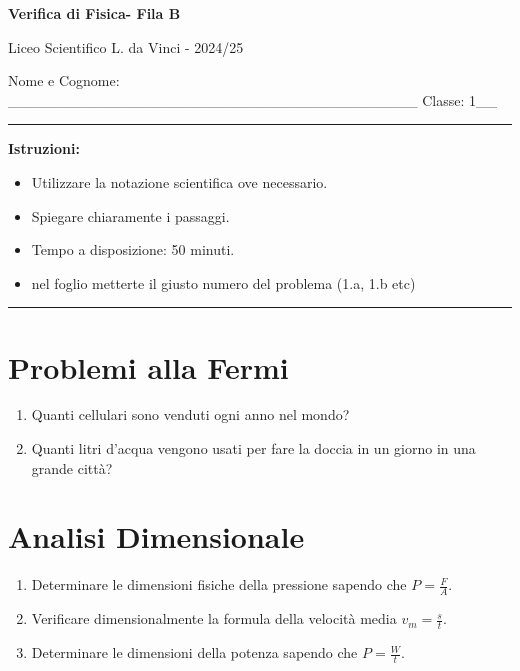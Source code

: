 \documentclass[12pt]{article}
\begin{document}
\begin{center}
    \textbf{\Large Verifica di Fisica- Fila B}
    \vspace{0.25cm}
    
    Liceo Scientifico L. da Vinci - 2024/25
    \vspace{0.25cm}
    
\end{center}
Nome e Cognome: \_\_\_\_\_\_\_\_\_\_\_\_\_\_\_\_\_\_\_\_\_\_\_\_\_\_\_\_\_\_\_\_\_\_\_\_\_\_\_ 
 \hspace{4cm} Classe: 1\_\_
\vspace{0.5cm}
\hrule
\vspace{0.5cm}

\textbf{Istruzioni:} 
\begin{itemize}
    \item Utilizzare la notazione scientifica ove necessario.
    \item Spiegare chiaramente i passaggi.
    \item Tempo a disposizione: 50 minuti.
    \item nel foglio metterte il giusto numero del problema (1.a, 1.b etc)
\end{itemize}
\hrule
\vspace{0.5cm}

\section{Problemi alla Fermi}
\begin{enumerate}[label=\alph*)]
        \item Quanti cellulari sono venduti ogni anno nel mondo?
        \item Quanti litri d’acqua vengono usati per fare la doccia in un giorno in una grande città?
    \end{enumerate}


\section{Analisi Dimensionale}

    \begin{enumerate}[label=\alph*)]
        \item Determinare le dimensioni fisiche della pressione sapendo che $P = \frac{F}{A}$.
        \item Verificare dimensionalmente la formula della velocità media $v_m = \frac{s}{t}$.
        \item Determinare le dimensioni della potenza sapendo che $P = \frac{W}{t}$.
    \end{enumerate}
\end{document}
